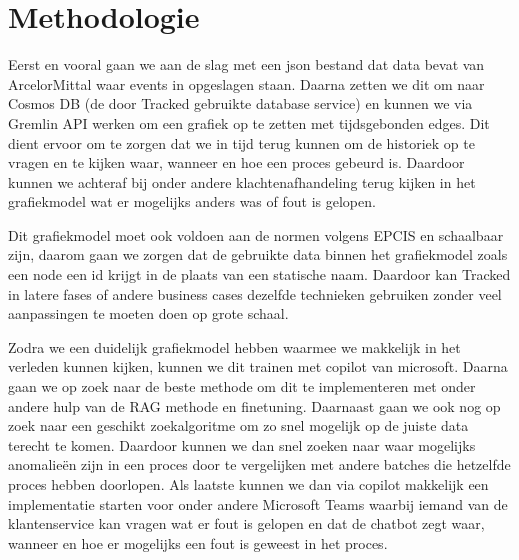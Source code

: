 \section{Methodologie}%
\label{sec:methodologie}
Eerst en vooral gaan we aan de slag met een json bestand dat data bevat van ArcelorMittal waar events in opgeslagen staan.
Daarna zetten we dit om naar Cosmos DB (de door Tracked gebruikte database service) en kunnen we via Gremlin API werken om een grafiek op te zetten met tijdsgebonden edges. Dit dient ervoor om te zorgen dat we in tijd terug kunnen om de historiek op te vragen en te kijken waar, wanneer en hoe een proces gebeurd is.
Daardoor kunnen we achteraf bij onder andere klachtenafhandeling terug kijken in het grafiekmodel wat er mogelijks anders was of fout is gelopen.

Dit grafiekmodel moet ook voldoen aan de normen volgens EPCIS en schaalbaar zijn, daarom gaan we zorgen dat de gebruikte data binnen het grafiekmodel zoals een node een id krijgt in de plaats van een statische naam.
Daardoor kan Tracked in latere fases of andere business cases dezelfde technieken gebruiken zonder veel aanpassingen te moeten doen op grote schaal.

Zodra we een duidelijk grafiekmodel hebben waarmee we makkelijk in het verleden kunnen kijken, kunnen we dit trainen met copilot van microsoft.
Daarna gaan we op zoek naar de beste methode om dit te implementeren met onder andere hulp van de RAG methode en finetuning. Daarnaast gaan we ook nog op zoek naar een geschikt zoekalgoritme om zo snel mogelijk op de juiste data terecht te komen.
Daardoor kunnen we dan snel zoeken naar waar mogelijks anomalieën zijn in een proces door te vergelijken met andere batches die hetzelfde proces hebben doorlopen.
Als laatste kunnen we dan via copilot makkelijk een implementatie starten voor onder andere Microsoft Teams waarbij iemand van de klantenservice kan vragen wat er fout is gelopen en dat de chatbot zegt waar, wanneer en hoe er mogelijks een fout is geweest in het proces.




